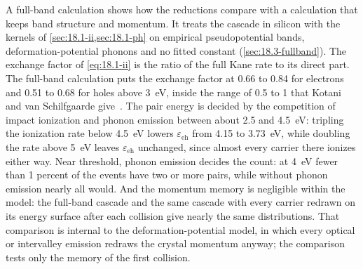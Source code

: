 A full-band calculation shows how the reductions compare with a calculation that keeps band structure and momentum. It treats the cascade in silicon with the kernels of \cref{sec:18.1-ii,sec:18.1-ph} on empirical pseudopotential bands, deformation-potential phonons and no fitted constant (\cref{sec:18.3-fullband}). The exchange factor of \cref{eq:18.1-ii} is the ratio of the full Kane rate to its direct part. The full-band calculation puts the exchange factor at 0.66 to 0.84 for electrons and 0.51 to 0.68 for holes above \SI{3}{eV}, inside the range of 0.5 to 1 that Kotani and van Schilfgaarde give~\cite[Eq.~(5)]{kotani2010impact}. The pair energy is decided by the competition of impact ionization and phonon emission between about 2.5 and \SI{4.5}{eV}: tripling the ionization rate below \SI{4.5}{eV} lowers $\varepsilon_{\mathrm{eh}}$ from 4.15 to \SI{3.73}{eV}, while doubling the rate above \SI{5}{eV} leaves $\varepsilon_{\mathrm{eh}}$ unchanged, since almost every carrier there ionizes either way. Near threshold, phonon emission decides the count: at \SI{4}{eV} fewer than 1 percent of the events have two or more pairs, while without phonon emission nearly all would. And the momentum memory is negligible within the model: the full-band cascade and the same cascade with every carrier redrawn on its energy surface after each collision give nearly the same distributions. That comparison is internal to the deformation-potential model, in which every optical or intervalley emission redraws the crystal momentum anyway; the comparison tests only the memory of the first collision.

